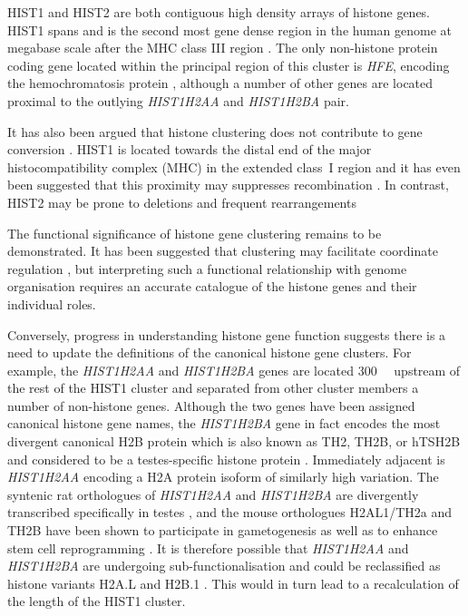     HIST1 and HIST2 are both contiguous high density arrays of histone genes.
    HIST1 spans 
    and is the second most gene dense region in the human genome at
    megabase scale after the MHC class III region \citep{MHC-III-analysis}.
    The only non-histone protein coding gene located within the principal region of this cluster
    is \textit{HFE}, encoding the hemochromatosis protein \citep{AlbigDoenecke1998},
    although a number of other genes are located
    proximal to the outlying \textit{HIST1H2AA} and \textit{HIST1H2BA} pair.

    It has also been argued that histone clustering
    does not contribute to gene conversion \citep{NeiRooney2005}.
    HIST1 is located towards the distal end of the major histocompatibility complex (MHC)
    in the extended class~I region \citep{MHC-I-transcript, MHC-complete-sequencing-1999}
    and it has even been suggested that this proximity
    may suppresses recombination \citep{MHC-repressed-by-HIST}.
    In contrast, HIST2 may be prone to deletions and frequent rearrangements
    \citep{HISTTwo-prone-deletion-discovery, HISTTwo-prone-deletion-focus}

    The functional significance of histone gene clustering remains to be demonstrated.
    It has been suggested that clustering may facilitate coordinate regulation \citep{Eirinlopez2009,close-regulators},
    but interpreting such a functional relationship with genome organisation
    requires an accurate catalogue of the histone genes and their individual roles.

    Conversely, progress in understanding histone gene function
    suggests there is a need to update the definitions of the canonical histone gene clusters.
    For example, the \textit{HIST1H2AA} and \textit{HIST1H2BA} genes
    are located \SI{300}{\kilo\bp} upstream of the rest of the HIST1 cluster
    and separated from other cluster members a number of non-histone genes.
    Although the two genes have been assigned canonical histone gene names,
    the \textit{HIST1H2BA} gene in fact encodes the most divergent canonical H2B protein
    which is also known as TH2, TH2B, or hTSH2B and considered to be
    a testes-specific histone protein \citep{Zalensky2002,LiAusio2005,ShinagawaIshii2014}.
    Immediately adjacent is \textit{HIST1H2AA} encoding
    a H2A protein isoform of similarly high variation.
    The syntenic rat orthologues of \textit{HIST1H2AA} and \textit{HIST1H2BA}
    are divergently transcribed specifically in testes \citep{HuhChae1991},
    and the mouse orthologues H2AL1/TH2a and TH2B have been shown to participate in gametogenesis \citep{GovinCaron2007}
    as well as to enhance stem cell reprogramming \citep{ShinagawaIshii2014,PadavattanKumarevel2015}.
    It is therefore possible that \textit{HIST1H2AA} and \textit{HIST1H2BA}
    are undergoing sub-functionalisation and could be reclassified
    as histone variants H2A.L and H2B.1 \citep{Talbert2012}.
    This would in turn lead to a recalculation of the length of the HIST1 cluster.

